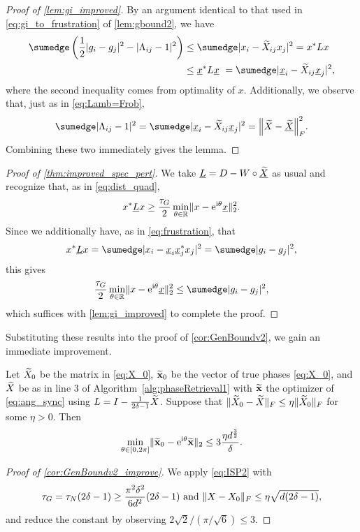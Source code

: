 \begin{proof}[Proof of \cref{lem:gi_improved}]
  By an argument identical to that used in \eqref{eq:gi_to_frustration} of \cref{lem:gbound2}, we have \begin{align*}\sumedge  \left(\frac{1}{2} |g_i - g_j|^2 - |\Lambda_{ij} - 1|^2\right) &\le \sumedge  \abs{x_i - \tX_{ij} x_j}^2 = x^* L x \\ &\le \ux^* L \ux \ = \sumedge  \abs{\ux_i - \tX_{ij} \ux_j}^2,\end{align*} where the second inequality comes from optimality of $x$.  Additionally, we observe that, just as in \eqref{eq:Lamb=Frob}, \[\sumedge \abs{\Lambda_{ij} - 1}^2 = \sumedge  \abs{\ux_i - \tX_{ij} \ux_j}^2 = \norm*{\tX - \utX}_F^2.\]  Combining these two immediately gives the lemma.
\end{proof}

\begin{proof}[Proof of \cref{thm:improved_spec_pert}]
  We take $\underline{L} = D - W \circ \underline{\widetilde{X}}$ as usual and recognize that, as in \eqref{eq:dist_quad}, \[x^* \underline{L} x \ge \frac{\tau_G}{2} \min_{\theta \in \mathbb{R}} \lVert x - \mathrm{e}^{\mathrm{i}\theta} \underline{x}\rVert_2^2.\]  Since we additionally have, as in \eqref{eq:frustration}, that \[x^* \uL x = \sumedge \abs{x_i - \ux_i \ux_j^* x_j}^2 = \sumedge\abs{g_i - g_j}^2,\] this gives \[\frac{\tau_G}{2} \min_{\theta \in \R} \norm{x - \ee^{\ii\theta} \ux}_2^2 \le \sumedge\abs{g_i - g_j}^2,\] which suffices with \cref{lem:gi_improved} to complete the proof.
\end{proof}

Substituting these results into the proof of \cref{cor:GenBoundv2}, we gain an immediate improvement.

\begin{corollary}
  Let $\widetilde{X}_0$ be the matrix in \eqref{eq:X_0}, $\widetilde{\mathbf{x}}_0$ be the vector of true phases \eqref{eq:X_0}, and $\widetilde{X}$ be as in line 3 of Algorithm~\ref{alg:phaseRetrieval1} with $\widetilde{\mathbf{x}}$ the optimizer of \eqref{eq:ang_sync} using $L = I - \frac{1}{2 \delta - 1} \widetilde{X}$.  Suppose that $\lVert\widetilde{X}_0 - \widetilde{X}\rVert_F \le \eta \lVert\widetilde{X}_0\rVert_F$ for some $\eta > 0$.  Then
  \[\min_{\theta\in[0,2\pi]} \lVert\widetilde{\mathbf{x}}_0 - \mathrm{e}^{\mathrm{i} \theta} \widetilde{\mathbf{x}}\rVert_2 \le 3 \dfrac{\eta d^{\frac{3}{2}}}{\delta}.\]
  \label{cor:GenBoundv2_improve}
\end{corollary}

\begin{proof}[Proof of \cref{cor:GenBoundv2_improve}]
  We apply \eqref{eq:ISP2} with \[\tau_G = \tau_N(2 \delta - 1) \ge \frac{\pi^2 \delta^2}{6 d^2}(2 \delta - 1) \ \text{and} \ \norm{X - X_0}_F \le \eta \sqrt{d (2 \delta - 1)},%
  \] and reduce the constant by observing $2 \sqrt{2} / (\pi / \sqrt{6}) \le 3$.
\end{proof}

